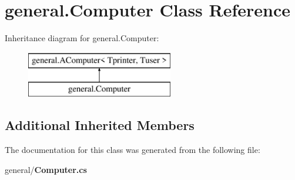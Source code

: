 \section{general.\-Computer Class Reference}
\label{classgeneral_1_1_computer}
Inheritance diagram for general.\-Computer\-:\begin{figure}[H]
\begin{center}
\leavevmode
\includegraphics[height=2.000000cm]{classgeneral_1_1_computer}
\end{center}
\end{figure}
\subsection*{Additional Inherited Members}


The documentation for this class was generated from the following file\-:\begin{DoxyCompactItemize}
\item 
general/{\bf Computer.\-cs}\end{DoxyCompactItemize}
